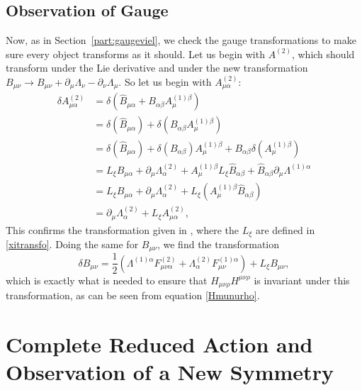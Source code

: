 \documentclass{article}
\begin{document}
\subsection{Observation of Gauge} \label{part:Bgauge}
Now, as in Section~\ref{part:gaugeviel}, we check the gauge transformations to make sure every object transforms as it should.
Let us begin with $A^{(2)}$, which should transform under the Lie derivative and under the new transformation $B_{\mu \nu} \rightarrow B_{\mu \nu} + \partial_\mu \Lambda_\nu - \partial_\nu \Lambda_\mu$. So let us begin
with $A^{(2)}_{\mu \alpha}$:
\begin{equation} 
    \begin{aligned}
        \delta A^{(2)}_{\mu \alpha}&= \delta(\hat B_{\mu \alpha}+ B_{\alpha\beta}A^{(1)\beta}_\mu)\\
        &=\delta(\hat B_{\mu \alpha})+ \delta(B_{\alpha\beta}A^{(1)\beta}_\mu)\\
        &= \delta(\hat B_{\mu \alpha})+ \delta(B_{\alpha\beta})A^{(1)\beta}_\mu+ B_{\alpha\beta}\delta(A^{(1)\beta}_\mu)\\
        &= L_{\xi} \hat B_{\mu \alpha} + \partial_\mu \Lambda^{(2)}_{\alpha}+A^{(1)\beta}_\mu L_{\xi} \hat B_{ \alpha \beta } +\hat B_{ \alpha \beta } \partial_\mu \Lambda^{(1)\alpha}\\
        &= L_{\xi} \hat B_{\mu \alpha} + \partial_\mu \Lambda^{(2)}_{\alpha}+L_{\xi} (A^{(1)\beta}_\mu \hat B_{ \alpha \beta })\\
        &=\partial_\mu \Lambda^{(2)}_{\alpha} +L_\xi A^{(2)}_{\mu \alpha},
    \end{aligned}
\end{equation}
This confirms the transformation given in \cite{maharana1993noncompact}, where the $L_{\xi}$ are defined in \eqref{xitransfo}.
Doing the same for $B_{\mu \nu}$, we find the transformation
\begin{equation}
    \delta B_{\mu \nu} = \frac{1}{2}(\Lambda^{(1)\alpha}F^{(2)}_{\mu \nu \alpha} + \Lambda^{(2)}_{\alpha}F^{(1)\alpha}_{\mu \nu}) + L_\xi B_{\mu \nu},
\end{equation}
which is exactly what is needed to ensure that $H_{\mu \nu \rho} H^{\mu \nu \rho}$ is invariant under this transformation, as can be seen from equation \eqref{Hmunurho}.

\section{Complete Reduced Action and Observation of a New Symmetry}
\end{document}
